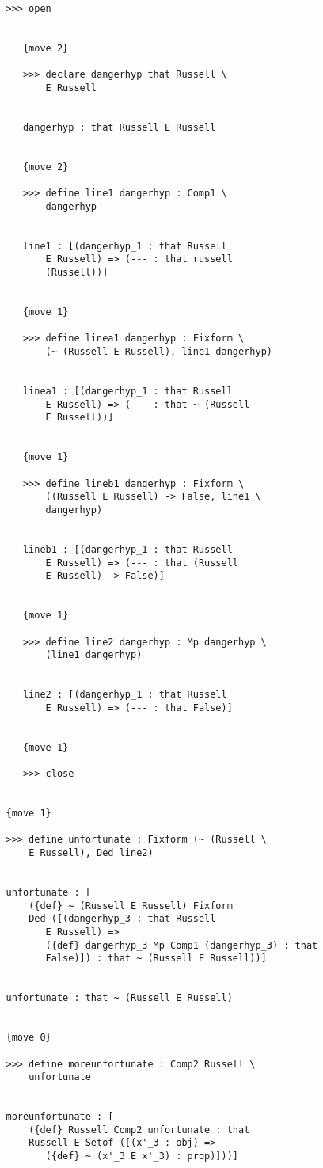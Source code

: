 \documentclass{slides}
\begin{document}
{\begin{slide}
{\begin{verbatim}
   >>> open


      {move 2}

      >>> declare dangerhyp that Russell \
          E Russell


      dangerhyp : that Russell E Russell


      {move 2}

      >>> define line1 dangerhyp : Comp1 \
          dangerhyp


      line1 : [(dangerhyp_1 : that Russell 
          E Russell) => (--- : that russell 
          (Russell))]


      {move 1}

      >>> define linea1 dangerhyp : Fixform \
          (~ (Russell E Russell), line1 dangerhyp)


      linea1 : [(dangerhyp_1 : that Russell 
          E Russell) => (--- : that ~ (Russell 
          E Russell))]


      {move 1}

      >>> define lineb1 dangerhyp : Fixform \
          ((Russell E Russell) -> False, line1 \
          dangerhyp)


      lineb1 : [(dangerhyp_1 : that Russell 
          E Russell) => (--- : that (Russell 
          E Russell) -> False)]


      {move 1}

      >>> define line2 dangerhyp : Mp dangerhyp \
          (line1 dangerhyp)


      line2 : [(dangerhyp_1 : that Russell 
          E Russell) => (--- : that False)]


      {move 1}

      >>> close


   {move 1}

   >>> define unfortunate : Fixform (~ (Russell \
       E Russell), Ded line2)


   unfortunate : [
       ({def} ~ (Russell E Russell) Fixform 
       Ded ([(dangerhyp_3 : that Russell 
          E Russell) => 
          ({def} dangerhyp_3 Mp Comp1 (dangerhyp_3) : that 
          False)]) : that ~ (Russell E Russell))]


   unfortunate : that ~ (Russell E Russell)


   {move 0}

   >>> define moreunfortunate : Comp2 Russell \
       unfortunate


   moreunfortunate : [
       ({def} Russell Comp2 unfortunate : that 
       Russell E Setof ([(x'_3 : obj) => 
          ({def} ~ (x'_3 E x'_3) : prop)]))]



\end{verbatim}}
\end{slide}}
\end{document}
